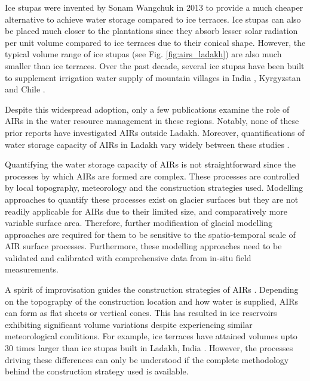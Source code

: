 Ice stupas were invented by Sonam Wangchuk in 2013 \cite{wangchukIceStupaArtificial2014} to provide a much
cheaper alternative to achieve water storage compared to ice terraces. Ice stupas can also be placed much closer
to the plantations since they absorb lesser solar radiation per unit volume compared to ice terraces due to
their conical shape. However, the typical volume range of ice stupas (see Fig. \ref{fig:airs_ladakh}) are also
much smaller than ice terraces. Over the past decade, several ice stupas have been built to supplement
irrigation water supply of mountain villages in India \citep{wangchukIceStupaCompetition2020,
palmerStoringFrozenWater2022, aggarwalAdaptationClimateChange2021}, Kyrgyzstan
\citep{bbcnewsBrightArtificialGlacier2020} and Chile \citep{reutersConservationistsChileAim2021}.

Despite this widespread adoption, only a few publications examine the role of AIRs in the water resource
management in these regions. Notably, none of these prior reports have investigated AIRs outside Ladakh.
Moreover, quantifications of water storage capacity of AIRs in Ladakh vary widely between these studies
\citep{norphelSnowWaterHarvesting2015, baglaArtificialGlaciersHelp1998}.

Quantifying the water storage capacity of AIRs is not straightforward since the processes by which AIRs are
formed are complex. These processes are controlled by local topography, meteorology and the construction
strategies used. Modelling approaches to quantify these processes exist on glacier surfaces but they are not
readily applicable for AIRs due to their limited size, and comparatively more variable surface area. Therefore,
further modification of glacial modelling approaches are required for them to be sensitive to the
spatio-temporal scale of AIR surface processes. Furthermore, these modelling approaches need to be validated and
calibrated with comprehensive data from in-situ field measurements. 

A spirit of improvisation guides the construction strategies of AIRs \cite{clouseLadakhArtificialGlaciers2017}.
Depending on the topography of the construction location and how water is supplied, AIRs can form as flat sheets
or vertical cones. This has resulted in ice reservoirs exhibiting significant volume variations despite
experiencing similar meteorological conditions. For example, ice terraces have attained volumes upto 30 times
larger than ice stupas built in Ladakh, India \cite{nusserSociohydrologyArtificialGlaciers2019}. However, the
processes driving these differences can only be understood if the complete methodology behind the construction
strategy used is available.

